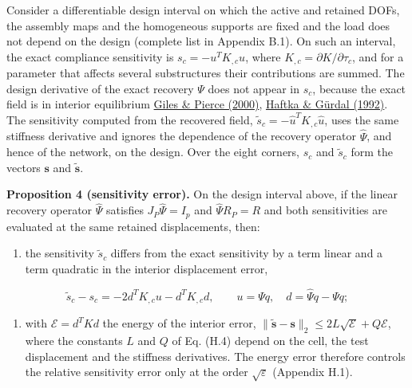 \documentclass[preprint,12pt,authoryear]{elsarticle}
\providecommand{\tightlist}{\setlength{\itemsep}{0pt}\setlength{\parskip}{0pt}}
\begin{document}
Consider a differentiable design interval on which the active and retained DOFs, the assembly maps and the homogeneous supports are fixed and the load does not depend on the design (complete list in Appendix B.1). On such an interval, the exact compliance sensitivity is \(s_c=-u^TK_{,c}u\), where \(K_{,c}=\partial K/\partial\tau_c\), and for a parameter that affects several substructures their contributions are summed. The design derivative of the exact recovery \(\Psi\) does not appear in \(s_c\), because the exact field is in interior equilibrium \href{https://doi.org/10.1023/a:1011430410075}{Giles \& Pierce (2000)}, \href{https://doi.org/10.1007/978-94-011-2550-5}{Haftka \& Gürdal (1992)}. The sensitivity computed from the recovered field, \(\widetilde s_c=-\widehat u^TK_{,c}\widehat u\), uses the same stiffness derivative and ignores the dependence of the recovery operator \(\widehat\Psi\), and hence of the network, on the design. Over the eight corners, \(s_c\) and \(\widetilde s_c\) form the vectors \(\boldsymbol s\) and \(\widetilde{\boldsymbol s}\).

\textbf{Proposition 4 (sensitivity error).} On the design interval above, if the linear recovery operator \(\widehat\Psi\) satisfies \(J_P\widehat\Psi=I_p\) and \(\widehat\Psi R_P=R\) and both sensitivities are evaluated at the same retained displacements, then:

\begin{enumerate}
\def\labelenumi{(\alph{enumi})}
\tightlist
\item
  the sensitivity \(\widetilde s_c\) differs from the exact sensitivity by a term linear and a term quadratic in the interior displacement error,
\end{enumerate}

\[
\boxed{\widetilde s_c-s_c=-2d^TK_{,c}u-d^TK_{,c}d,
\qquad u=\Psi q,\quad d=\widehat\Psi q-\Psi q;}
\tag{17}
\]

\begin{enumerate}
\def\labelenumi{(\alph{enumi})}
\setcounter{enumi}{1}
\tightlist
\item
  with \(\mathcal E=d^TKd\) the energy of the interior error, \(\|\widetilde{\boldsymbol s}-\boldsymbol s\|_2\le2L\sqrt{\mathcal E}+Q\mathcal E\), where the constants \(L\) and \(Q\) of Eq. (H.4) depend on the cell, the test displacement and the stiffness derivatives. The energy error therefore controls the relative sensitivity error only at the order \(\sqrt\varepsilon\) (Appendix H.1).
\end{enumerate}
\end{document}
